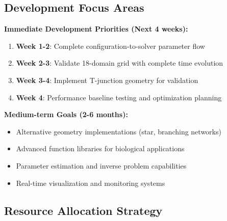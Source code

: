 \documentclass[11pt,a4paper]{article}
\begin{document}
\subsection{Development Focus Areas}

\begin{todobox}
\textbf{Immediate Development Priorities (Next 4 weeks):}

\begin{enumerate}[leftmargin=1.5em]
    \item \textbf{Week 1-2}: Complete configuration-to-solver parameter flow
    \item \textbf{Week 2-3}: Validate 18-domain grid with complete time evolution
    \item \textbf{Week 3-4}: Implement T-junction geometry for validation
    \item \textbf{Week 4}: Performance baseline testing and optimization planning
\end{enumerate}

\textbf{Medium-term Goals (2-6 months):}
\begin{itemize}[leftmargin=1.5em]
    \item Alternative geometry implementations (star, branching networks)
    \item Advanced function libraries for biological applications
    \item Parameter estimation and inverse problem capabilities
    \item Real-time visualization and monitoring systems
\end{itemize}
\end{todobox}

\subsection{Resource Allocation Strategy}

\begin{center}
\end{center}
\end{document}
